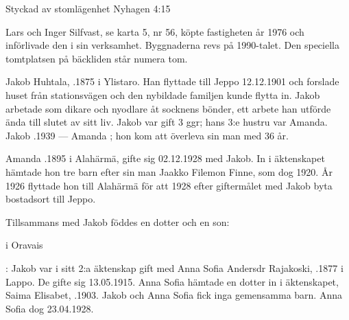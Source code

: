 
Styckad av stomlägenhet Nyhagen 4:15

Lars och Inger Silfvast, se karta 5, nr 56, köpte fastigheten år 1976 och införlivade den i sin verksamhet. Byggnaderna revs på 1990-talet. Den speciella tomtplatsen på bäckliden står numera tom.



Jakob Huhtala, .1875 i Ylistaro. Han flyttade till Jeppo 12.12.1901 och forslade huset från stationsvägen och den nybildade familjen kunde flytta in. Jakob  arbetade som dikare och nyodlare åt socknens bönder, ett arbete han utförde ända till slutet av sitt liv. Jakob var gift 3 ggr; hans 3:e hustru var Amanda.
Jakob .1939  ---  Amanda ; hon kom att överleva sin man med 36 år.

Amanda .1895 i Alahärmä, gifte sig 02.12.1928 med Jakob. In i äktenskapet hämtade hon tre barn efter sin man Jaakko Filemon Finne, som dog 1920. År 1926 flyttade hon till Alahärmä för att 1928 efter giftermålet med Jakob byta bostadsort till Jeppo.
\begin{jhchildren}
  \item {}
  \item {}
  \item {}
\end{jhchildren}
Tillsammans med Jakob föddes en dotter och en son:
  \begin{jhchildren}
    \item {} i Oravais
    \item {}
\end{jhchildren}


:
Jakob var i sitt 2:a äktenskap gift  med Anna Sofia Andersdr Rajakoski, .1877 i Lappo. De gifte sig 13.05.1915. Anna Sofia hämtade en dotter in i äktenskapet, Saima Elisabet, .1903. Jakob och Anna Sofia fick inga gemensamma barn. Anna Sofia dog  23.04.1928.

